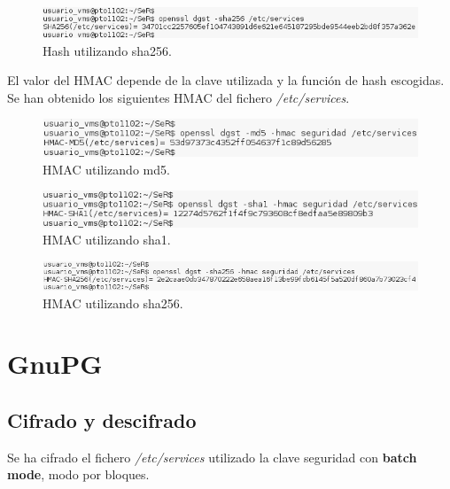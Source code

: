 \documentclass[11pt]{article}
\begin{document}
      \begin{figure}[!ht]
        \centering
        \includegraphics[width = .9\textwidth]{hash_sha256}
        \caption{Hash utilizando sha256.}
      \end{figure}

      \FloatBarrier
      \bigskip
      \par
      El valor del HMAC depende de la clave utilizada y la función de hash escogidas.
      Se han obtenido los siguientes HMAC del fichero \textit{/etc/services}.

      \begin{figure}[!ht]
        \centering
        \includegraphics[width = .9\textwidth]{hmac_md5}
        \caption{HMAC utilizando md5.}
      \end{figure}

      \begin{figure}[!ht]
        \centering
        \includegraphics[width = .9\textwidth]{hmac_sha1}
        \caption{HMAC utilizando sha1.}
      \end{figure}

      \begin{figure}[!ht]
        \centering
        \includegraphics[width = .9\textwidth]{hmac_sha256}
        \caption{HMAC utilizando sha256.}
      \end{figure}

  \newpage
  \section{GnuPG}
    \subsection{Cifrado y descifrado}
      \par
      Se ha cifrado el fichero \textit{/etc/services} utilizado la clave seguridad con \textbf{batch mode}, modo por bloques.
\end{document}
